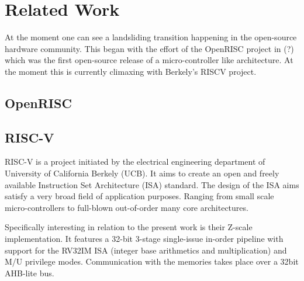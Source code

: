 

\chapter{Related Work}

At the moment one can see a landsliding transition happening in the open-source hardware community. This began with the 
effort of the OpenRISC project in (?) which was the first open-source release of a micro-controller like architecture. 
At the moment this is currently climaxing with Berkely's RISCV project. 

\section{OpenRISC}


\section{RISC-V}

RISC-V is a project initiated by the electrical engineering department of University of California Berkely (UCB). It aims
to create an open and freely available Instruction Set Architecture (ISA) standard. The design of the ISA aims satisfy a very broad 
field of application purposes. Ranging from small scale micro-controllers to full-blown out-of-order many core architectures.

Specifically interesting in relation to the present work is their Z-scale implementation. It features a 32-bit 3-stage single-issue in-order 
pipeline with support for the RV32IM ISA (integer base arithmetics and multiplication) and M/U privilege modes. Communication with
the memories takes place over a 32bit AHB-lite bus.

